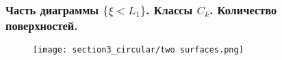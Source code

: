% 
%
%
%
%
%

\begin{frame}\frametitle{Часть диаграммы $\{ \xi < L_1\}$. Классы $C_k$. Количество поверхностей.}
\begin{figure}[!htb]
\centering
\texttt{[image: section3\_circular/two surfaces.png]}
\end{figure}
\end{frame}





